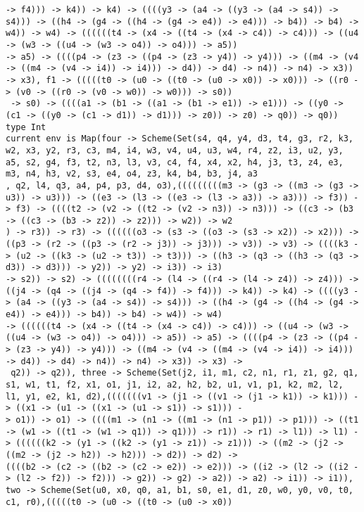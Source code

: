\documentclass[11pt,oneside,a4paper]{report}
\begin{document}
\begin{lstlisting}[breaklines=true,caption={The output of an exponential type},label=lst:appedix:bigexp]
-> f4))) -> k4)) -> k4) -> ((((y3 -> (a4 -> ((y3 -> (a4 -> s4)) -> s4))) -> ((h4 -> (g4 -> ((h4 -> (g4 -> e4)) -> e4))) -> b4)) -> b4) -> w4)) -> w4) -> ((((((t4 -> (x4 -> ((t4 -> (x4 -> c4)) -> c4))) -> ((u4 -> (w3 -> ((u4 -> (w3 -> o4)) -> o4))) -> a5))
-> a5) -> ((((p4 -> (z3 -> ((p4 -> (z3 -> y4)) -> y4))) -> ((m4 -> (v4 -> ((m4 -> (v4 -> i4)) -> i4))) -> d4)) -> d4) -> n4)) -> n4) -> x3)) -> x3), f1 -> (((((t0 -> (u0 -> ((t0 -> (u0 -> x0)) -> x0))) -> ((r0 -> (v0 -> ((r0 -> (v0 -> w0)) -> w0))) -> s0))
 -> s0) -> ((((a1 -> (b1 -> ((a1 -> (b1 -> e1)) -> e1))) -> ((y0 -> (c1 -> ((y0 -> (c1 -> d1)) -> d1))) -> z0)) -> z0) -> q0)) -> q0))
type Int
current env is Map(four -> Scheme(Set(s4, q4, y4, d3, t4, g3, r2, k3, w2, x3, y2, r3, c3, m4, i4, w3, v4, u4, u3, w4, r4, z2, i3, u2, y3, a5, s2, g4, f3, t2, n3, l3, v3, c4, f4, x4, x2, h4, j3, t3, z4, e3, m3, n4, h3, v2, s3, e4, o4, z3, k4, b4, b3, j4, a3
, q2, l4, q3, a4, p4, p3, d4, o3),(((((((((m3 -> (g3 -> ((m3 -> (g3 -> u3)) -> u3))) -> ((e3 -> (l3 -> ((e3 -> (l3 -> a3)) -> a3))) -> f3)) -> f3) -> ((((t2 -> (v2 -> ((t2 -> (v2 -> n3)) -> n3))) -> ((c3 -> (b3 -> ((c3 -> (b3 -> z2)) -> z2))) -> w2)) -> w2
) -> r3)) -> r3) -> ((((((o3 -> (s3 -> ((o3 -> (s3 -> x2)) -> x2))) -> ((p3 -> (r2 -> ((p3 -> (r2 -> j3)) -> j3))) -> v3)) -> v3) -> ((((k3 -> (u2 -> ((k3 -> (u2 -> t3)) -> t3))) -> ((h3 -> (q3 -> ((h3 -> (q3 -> d3)) -> d3))) -> y2)) -> y2) -> i3)) -> i3)
-> s2)) -> s2) -> ((((((((r4 -> (l4 -> ((r4 -> (l4 -> z4)) -> z4))) -> ((j4 -> (q4 -> ((j4 -> (q4 -> f4)) -> f4))) -> k4)) -> k4) -> ((((y3 -> (a4 -> ((y3 -> (a4 -> s4)) -> s4))) -> ((h4 -> (g4 -> ((h4 -> (g4 -> e4)) -> e4))) -> b4)) -> b4) -> w4)) -> w4)
-> ((((((t4 -> (x4 -> ((t4 -> (x4 -> c4)) -> c4))) -> ((u4 -> (w3 -> ((u4 -> (w3 -> o4)) -> o4))) -> a5)) -> a5) -> ((((p4 -> (z3 -> ((p4 -> (z3 -> y4)) -> y4))) -> ((m4 -> (v4 -> ((m4 -> (v4 -> i4)) -> i4))) -> d4)) -> d4) -> n4)) -> n4) -> x3)) -> x3) ->
 q2)) -> q2)), three -> Scheme(Set(j2, i1, m1, c2, n1, r1, z1, g2, q1, s1, w1, t1, f2, x1, o1, j1, i2, a2, h2, b2, u1, v1, p1, k2, m2, l2, l1, y1, e2, k1, d2),(((((((v1 -> (j1 -> ((v1 -> (j1 -> k1)) -> k1))) -> ((x1 -> (u1 -> ((x1 -> (u1 -> s1)) -> s1))) -
> o1)) -> o1) -> ((((m1 -> (n1 -> ((m1 -> (n1 -> p1)) -> p1))) -> ((t1 -> (w1 -> ((t1 -> (w1 -> q1)) -> q1))) -> r1)) -> r1) -> l1)) -> l1) -> ((((((k2 -> (y1 -> ((k2 -> (y1 -> z1)) -> z1))) -> ((m2 -> (j2 -> ((m2 -> (j2 -> h2)) -> h2))) -> d2)) -> d2) ->
((((b2 -> (c2 -> ((b2 -> (c2 -> e2)) -> e2))) -> ((i2 -> (l2 -> ((i2 -> (l2 -> f2)) -> f2))) -> g2)) -> g2) -> a2)) -> a2) -> i1)) -> i1)), two -> Scheme(Set(u0, x0, q0, a1, b1, s0, e1, d1, z0, w0, y0, v0, t0, c1, r0),(((((t0 -> (u0 -> ((t0 -> (u0 -> x0))

\end{lstlisting}
\end{document}
